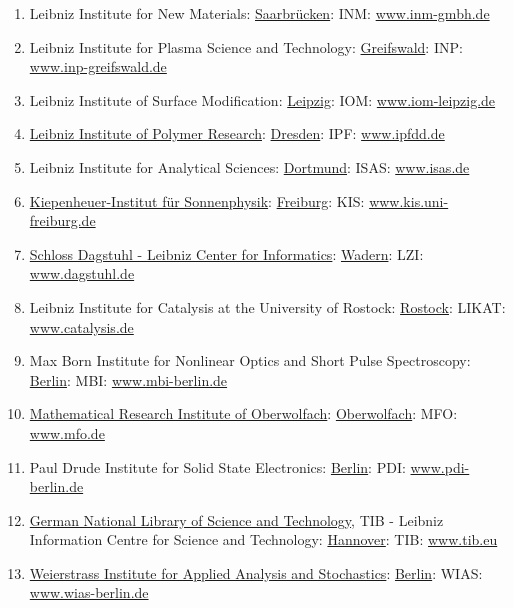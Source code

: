 \documentclass{book}
\numberwithin{equation}{section}
\begin{document}
\begin{enumerate}
    \item Leibniz Institute for New Materials: \href{https://en.wikipedia.org/wiki/Saarbr%C3%BCcken}{Saarbrücken}: INM: \url{www.inm-gmbh.de}
    \item Leibniz Institute for Plasma Science and Technology: \href{https://en.wikipedia.org/wiki/University_of_Greifswald}{Greifswald}: INP: \url{www.inp-greifswald.de}
    \item Leibniz Institute of Surface Modification: \href{https://en.wikipedia.org/wiki/Leipzig}{Leipzig}: IOM: \url{www.iom-leipzig.de}
    \item \href{https://en.wikipedia.org/wiki/Leibniz_Institute_of_Polymer_Research}{Leibniz Institute of Polymer Research}: \href{https://en.wikipedia.org/wiki/Dresden}{Dresden}: IPF: \url{www.ipfdd.de}
    \item Leibniz Institute for Analytical Sciences: \href{https://en.wikipedia.org/wiki/Dortmund}{Dortmund}: ISAS: \url{www.isas.de}
    \item \href{https://en.wikipedia.org/wiki/Kiepenheuer-Institut_f%C3%BCr_Sonnenphysik}{Kiepenheuer-Institut für Sonnenphysik}: \href{https://en.wikipedia.org/wiki/Freiburg}{Freiburg}: KIS: \url{www.kis.uni-freiburg.de}
    \item \href{https://en.wikipedia.org/wiki/Schloss_Dagstuhl_-_Leibniz_Center_for_Informatics}{Schloss Dagstuhl - Leibniz Center for Informatics}: \href{https://en.wikipedia.org/wiki/Wadern}{Wadern}: LZI: \url{www.dagstuhl.de}
    \item Leibniz Institute for Catalysis at the University of Rostock: \href{https://en.wikipedia.org/wiki/Rostock}{Rostock}: LIKAT: \url{www.catalysis.de}
    \item Max Born Institute for Nonlinear Optics and Short Pulse Spectroscopy: \href{https://en.wikipedia.org/wiki/Berlin}{Berlin}: MBI: \url{www.mbi-berlin.de}
    \item \href{https://en.wikipedia.org/wiki/Mathematical_Research_Institute_of_Oberwolfach}{Mathematical Research Institute of Oberwolfach}: \href{https://en.wikipedia.org/wiki/Oberwolfach}{Oberwolfach}: MFO: \url{www.mfo.de}
    \item Paul Drude Institute for Solid State Electronics: \href{https://en.wikipedia.org/wiki/Berlin}{Berlin}: PDI: \url{www.pdi-berlin.de}
    \item \href{https://en.wikipedia.org/wiki/German_National_Library_of_Science_and_Technology}{German National Library of Science and Technology}, TIB - Leibniz Information Centre for Science and Technology: \href{https://en.wikipedia.org/wiki/Hannover}{Hannover}: TIB: \url{www.tib.eu}
    \item \href{https://en.wikipedia.org/wiki/Weierstrass_Institute_for_Applied_Analysis_and_Stochastics}{Weierstrass Institute for Applied Analysis and Stochastics}: \href{https://en.wikipedia.org/wiki/Berlin}{Berlin}: WIAS: \url{www.wias-berlin.de}
\end{enumerate}
\end{document}
